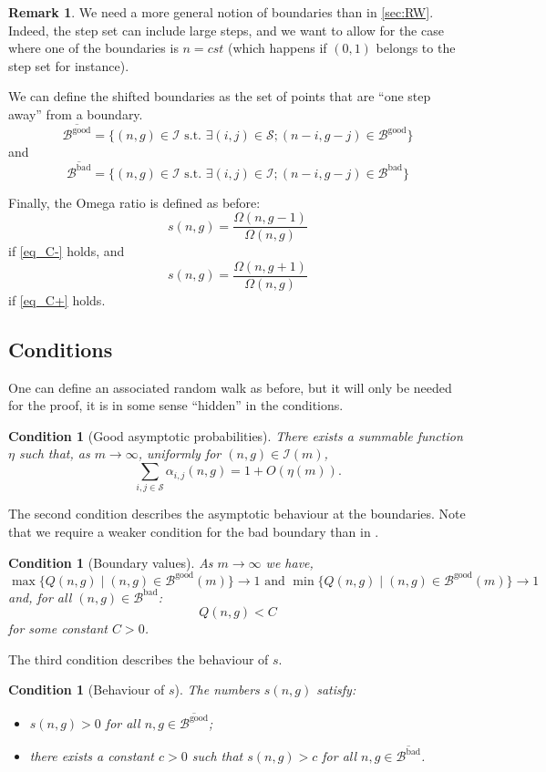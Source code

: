 \documentclass[a4paper,12pt]{article}
\newtheorem{condition}[theorem]{Condition}
\theoremstyle{definition}
\newtheorem{remark}[theorem]{Remark}
\newcommand{\goodB}{\mathcal{B}^{\text{good}}}
\newcommand{\goodBB}{\overline{\goodB}}
\newcommand{\badB}{\mathcal{B}^{\text{bad}}}
\newcommand{\badBB}{\overline{\badB}}
\newcommand{\mstrict}{\ensuremath{(n,g)\in \mathcal I(m)}}
\begin{document}
\begin{remark}
    We need a more general notion of boundaries than in \cref{sec:RW}. Indeed, the step set can include large steps, and we want to allow for the case where one of the boundaries is $n=cst$ (which happens if $(0,1)$ belongs to the step set for instance).
\end{remark}

We can define the shifted boundaries as the set of points that are ``one step away'' from a boundary.
\[\goodBB=\{(n,g)\in \mathcal I\text{ s.t. }\exists (i,j)\in \mathcal S; (n-i,g-j)\in \goodB\}\]
and 
\[\badBB=\{(n,g)\in \mathcal I\text{ s.t. }\exists (i,j)\in \mathcal I; (n-i,g-j)\in \badB\}\]

Finally, the Omega ratio is defined as before:
\[s(n,g)=\frac{\Omega(n,g-1)}{\Omega(n,g)}\]
if \eqref{eq_C-} holds, and 
\[s(n,g)=\frac{\Omega(n,g+1)}{\Omega(n,g)}\]
if \eqref{eq_C+} holds.

\subsection{Conditions}
One can define an associated random walk as before, but it will only be needed for the proof, it is in some sense ``hidden'' in the conditions. 

\begin{condition}[Good asymptotic probabilities]\label{assum_alpha_beta_general}
There exists a summable function $\eta$ such that, as $m\to\infty$, uniformly for \mstrict, 
\[\sum_{i,j\in\mathcal{S}} \alpha_{i,j}(n,g)=1+O\left(\eta(m)\right).\]
\end{condition}



The second condition describes the asymptotic behaviour at the boundaries. 
Note that we require a weaker condition for the bad boundary than in .
\begin{condition}[Boundary values]\label{assum_bd_values_general}
    As $m\to\infty$  we have,
    \[\max\{Q(n,g) \mid (n,g)\in \goodB(m)\}\to 1\text{ and }\min\{Q(n,g)\mid (n,g)\in \goodB(m)\}\to 1\]
    and, for all $(n,g)\in \badB$:
    \[Q(n,g)<C\]
    for some constant $C>0$.
\end{condition}

The third condition describes the behaviour of $s$. 
\begin{condition}[Behaviour of $s$]\label{assum_behavior_s_general}
The numbers $s(n,g)$ satisfy:
\begin{itemize}
    \item $s(n,g)>0$ for all $n,g\in \goodBB$;
    \item there exists a constant $c>0$ such that $s(n,g)>c$ for all $n,g\in \badBB$.
\end{itemize}
\end{condition}
\end{document}
